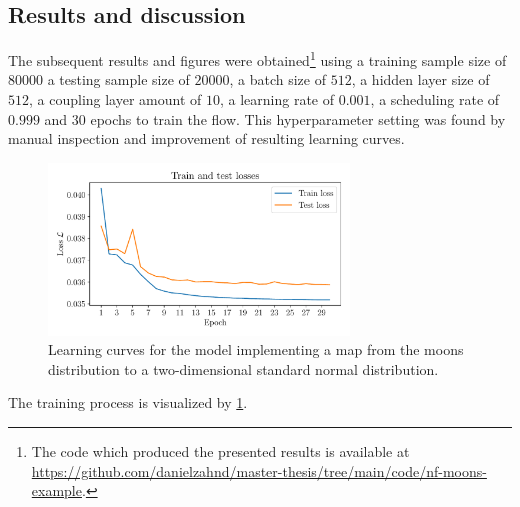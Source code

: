 \documentclass[a4paper,12pt]{report}
\begin{document}
\subsection{Results and discussion}
The subsequent results and figures were obtained\footnote{The code which produced the presented results is available at \url{https://github.com/danielzahnd/master-thesis/tree/main/code/nf-moons-example}.} using a training sample size of $80000$ a testing sample size of $20000$, a batch size of $512$, a hidden layer size of $512$, a coupling layer amount of $10$, a learning rate of $0.001$, a scheduling rate of $0.999$ and $30$ epochs to train the flow. This hyperparameter setting was found by manual inspection and improvement of resulting learning curves.
\begin{figure}[h!]
\centering
\includegraphics[width=8cm]{figures/nf-moons-example-loss}
\caption{Learning curves for the model implementing a map from the moons distribution to a two-dimensional standard normal distribution.}
\label{fig:nf-moons-example-loss}
\end{figure}
The training process is visualized by \cref{fig:nf-moons-example-loss}.
\end{document}

